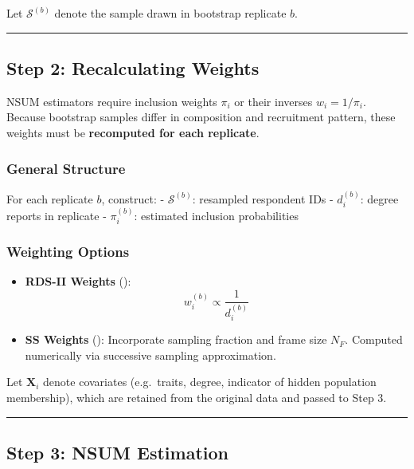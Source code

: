 \documentclass[
  12pt,
  letterpaper,
  DIV=11,
  numbers=noendperiod]{scrartcl}
\theoremstyle{plain}
\theoremstyle{definition}
\begin{document}
Let \(\mathcal{S}^{(b)}\) denote the sample drawn in bootstrap replicate
\(b\).

\begin{center}\rule{0.5\linewidth}{0.5pt}\end{center}

\subsection{Step 2: Recalculating
Weights}\label{step-2-recalculating-weights}

NSUM estimators require inclusion weights \(\pi_i\) or their inverses
\(w_i = 1 / \pi_i\). Because bootstrap samples differ in composition and
recruitment pattern, these weights must be \textbf{recomputed for each
replicate}.

\subsubsection{General Structure}\label{general-structure}

For each replicate \(b\), construct: - \(\mathcal{S}^{(b)}\): resampled
respondent IDs - \(d_i^{(b)}\): degree reports in replicate -
\(\pi_i^{(b)}\): estimated inclusion probabilities

\subsubsection{Weighting Options}\label{weighting-options}

\begin{itemize}
\item
  \textbf{RDS-II Weights} (\textcite{volz08-simple}): \[
  w_i^{(b)} \propto \frac{1}{d_i^{(b)}}
  \]
\item
  \textbf{SS Weights} (\textcite{gile11-improv}): Incorporate sampling
  fraction and frame size \(N_F\). Computed numerically via successive
  sampling approximation.
\end{itemize}

Let \(\mathbf{X}_i\) denote covariates (e.g.~traits, degree, indicator
of hidden population membership), which are retained from the original
data and passed to Step 3.

\begin{center}\rule{0.5\linewidth}{0.5pt}\end{center}

\subsection{Step 3: NSUM Estimation}\label{step-3-nsum-estimation}
\end{document}
